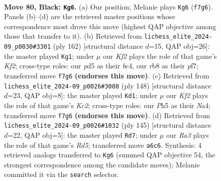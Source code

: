 \documentclass[11pt]{article}
\begin{document}
\clearpage

\begin{figure}[p]\centering
\begin{subfigure}{0.46\textwidth}\centering
\resizebox{\linewidth}{!}{%
\newchessgame
\chessboard[
  setfen={1R6/5kp1/r1N2p2/3P3p/7P/6P1/5K2/8 b - - 0 80},
  showmover=false,
  pgfstyle=straightmove, color=movearrow, markmove={f7-g6}
]}
\caption{}
\end{subfigure}\hfill
\begin{subfigure}{0.46\textwidth}\centering
\resizebox{\linewidth}{!}{%
\newchessgame
\chessboard[
  setfen={8/5p2/6p1/7p/2b5/R1n2P1P/3k1KP1/8 w - - 38 82},
  showmover=false,
  pgfstyle=straightmove, color=movearrow, markmove={f2-g1}
]}
\caption{}
\end{subfigure}
\\[4pt]
\begin{subfigure}{0.46\textwidth}\centering
\resizebox{\linewidth}{!}{%
\newchessgame
\chessboard[
  setfen={8/8/2pk4/p7/N7/1PP2nR1/2K4r/8 w - - 19 75},
  showmover=false,
  pgfstyle=straightmove, color=movearrow, markmove={c2-d1}
]}
\caption{}
\end{subfigure}\hfill
\begin{subfigure}{0.46\textwidth}\centering
\resizebox{\linewidth}{!}{%
\newchessgame
\chessboard[
  setfen={8/5p2/6p1/2k3P1/2prPP2/4K3/8/1R6 b - - 3 73},
  showmover=false,
  pgfstyle=straightmove, color=movearrow, markmove={d4-d7}
]}
\caption{}
\end{subfigure}
\caption{\textbf{Move 80, Black: \texttt{Kg6}.} (a) Our position; Melanie plays \texttt{Kg6} (\texttt{f7g6}). Panels (b)--(d) are the retrieved master positions whose correspondence most drove this move (highest QAP objective among those that transfer to it). (b) Retrieved from \texttt{lichess\_elite\_2024-09\_p0030\#3301} (ply 162) [structural distance $d$=15, QAP obj=26]: the master played \texttt{Kg1}; under $\mu$ our \emph{Kf2} plays the role of that game's \emph{Kf2}; cross-type roles: our \emph{p}d5 as their \emph{b}c4, our \emph{r}b8 as their \emph{p}f7; transferred move \texttt{f7g6} \textbf{(endorses this move)}. (c) Retrieved from \texttt{lichess\_elite\_2024-09\_p0026\#3008} (ply 148) [structural distance $d$=23, QAP obj=8]: the master played \texttt{Kd1}; under $\mu$ our \emph{Kf2} plays the role of that game's \emph{Kc2}; cross-type roles: our \emph{P}h5 as their \emph{N}a4; transferred move \texttt{f7g6} \textbf{(endorses this move)}. (d) Retrieved from \texttt{lichess\_elite\_2024-09\_p0026\#1032} (ply 145) [structural distance $d$=22, QAP obj=5]: the master played \texttt{Rd7}; under $\mu$ our \emph{Ra3} plays the role of that game's \emph{Rd5}; transferred move \texttt{a6c6}. Synthesis: 4 retrieved analogs transferred to \texttt{Kg6} (summed QAP objective 54, the strongest correspondence among the candidate moves); Melanie committed it via the \texttt{search} selector.}
\label{fig:thought-m159}
\end{figure}
\end{document}
